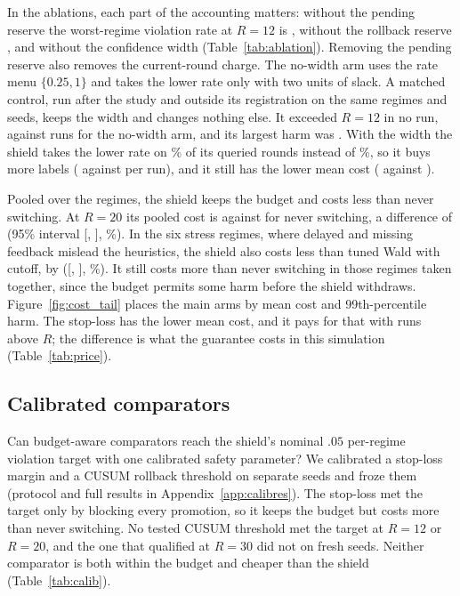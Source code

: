 \documentclass[10pt]{article}
\theoremstyle{plain}
\theoremstyle{definition}
\begin{document}
In the ablations, each part of the accounting matters: without the pending reserve the worst-regime violation rate at $R=12$ is \AblNoPending, without the rollback reserve \AblNoRollback, and without the confidence width \AblNoConf{} (Table~\ref{tab:ablation}). Removing the pending reserve also removes the current-round charge. The no-width arm uses the rate menu $\{0.25,1\}$ and takes the lower rate only with two units of slack. A matched control, run after the study and outside its registration on the same regimes and seeds, keeps the width and changes nothing else. It exceeded $R=12$ in no run, against \CtrlNoConfViol{} runs for the no-width arm, and its largest harm was \CtrlMax. With the width the shield takes the lower rate on \CtrlLow\% of its queried rounds instead of \CtrlNoConfLow\%, so it buys more labels (\CtrlLabels{} against \CtrlNoConfLabels{} per run), and it still has the lower mean cost (\CtrlJ{} against \CtrlNoConfJ).

Pooled over the regimes, the shield keeps the budget and costs less than never switching. At $R=20$ its pooled cost is \JFthreeTwenty{} against \JNever{} for never switching, a difference of \SimVsNeverDelta{} (95\% interval [\SimVsNeverLo, \SimVsNeverHi], \SimVsNeverPct\%). In the six stress regimes, where delayed and missing feedback mislead the heuristics, the shield also costs less than tuned Wald with cutoff, by \StressDelta{} ([\StressLo, \StressHi], \StressPct\%). It still costs more than never switching in those regimes taken together, since the budget permits some harm before the shield withdraws. Figure~\ref{fig:cost_tail} places the main arms by mean cost and 99th-percentile harm. The stop-loss has the lower mean cost, and it pays for that with runs above $R$; the difference is what the guarantee costs in this simulation (Table~\ref{tab:price}).



\begin{table}[!htbp]
\caption{Exceedance rates of $R=20$, pooled as the mean of per-regime rates over the six stress regimes and the 24 original regimes. Rates are rounded to three decimals; a displayed 0.000 need not mean zero run-level exceedances.}\label{tab:split}
\centering\small

\end{table}

\subsection{Calibrated comparators}\label{sec:calib}
Can budget-aware comparators reach the shield's nominal $.05$ per-regime violation target with one calibrated safety parameter? We calibrated a stop-loss margin and a CUSUM rollback threshold on separate seeds and froze them (protocol and full results in Appendix~\ref{app:calibres}). The stop-loss met the target only by blocking every promotion, so it keeps the budget but costs more than never switching. No tested CUSUM threshold met the target at $R=12$ or $R=20$, and the one that qualified at $R=30$ did not on fresh seeds. Neither comparator is both within the budget and cheaper than the shield (Table~\ref{tab:calib}).
\end{document}

